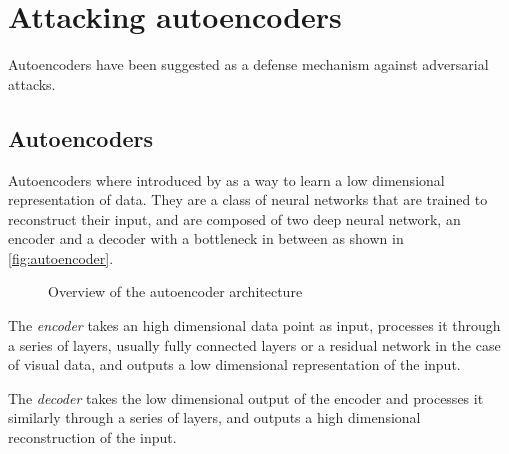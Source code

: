 \documentclass[]{scrarticle}
\renewcommand{\todo}[1]{}
\begin{document}
\clearpage

\section{Attacking autoencoders}

Autoencoders have been suggested as a defense mechanism against adversarial attacks.
\todo{add citation}

\subsection{Autoencoders}

Autoencoders where introduced by \cite{hinton2006reducing} as a way to learn
a low dimensional representation of data.
They are a class of neural networks that are trained to reconstruct their input,
and are composed of two deep neural network, an encoder and a decoder with a bottleneck in between
as shown in \autoref{fig:autoencoder}.

\begin{figure}[h]
  \centering
  \caption{Overview of the autoencoder architecture}
  \label{fig:autoencoder}
\end{figure}

The \emph{encoder} takes an high dimensional data point as input,
processes it through a series of layers, usually fully connected layers
or a residual network \cite{He2015DeepRL} in the case of visual data,
and outputs a low dimensional representation of the input.

The \emph{decoder} takes the low dimensional output of the encoder and
processes it similarly through a series of layers,
and outputs a high dimensional reconstruction of the input.
\end{document}
